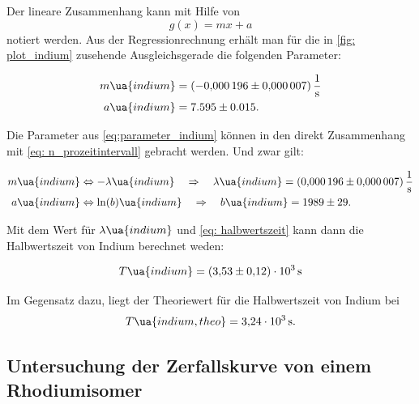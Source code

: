Der lineare Zusammenhang kann mit Hilfe von
\begin{equation*}
  g(x)=mx+a
\end{equation*}
notiert werden.
Aus der Regressionrechnung erhält man für die in \ref{fig: plot_indium} zusehende
Ausgleichsgerade die folgenden Parameter:

\begin{align}
  \label{eq:parameter_indium}
  \begin{aligned}
    m\ua{indium}&=\SI{-0.000196\pm0.000007}{\per\second}\\
    a\ua{indium}&=7.595\pm0.015.
  \end{aligned}
\end{align}

Die Parameter aus \eqref{eq:parameter_indium} können in den direkt Zusammenhang mit
\eqref{eq: n_prozeitintervall} gebracht werden. Und zwar gilt:

\begin{align}
  \label{eq:parameter_indium}
  \begin{aligned}
    m\ua{indium}&\Leftrightarrow -\lambda\ua{indium} \quad \Rightarrow \quad \lambda\ua{indium}=\SI{0.000196\pm0.000007}{\per\second}\\
    a\ua{indium}&\Leftrightarrow \ln(b)\ua{indium} \quad \Rightarrow \quad b\ua{indium} =1989\pm 29.
  \end{aligned}
\end{align}

Mit dem Wert für $\lambda\ua{indium}$ und \eqref{eq: halbwertszeit} kann dann die Halbwertszeit von Indium
berechnet weden:

\begin{equation}
  \label{eq:halbwertzeit_indium}
  T\ua{indium}=\SI{3.53\pm0.12 e+3}{\second}
\end{equation}

Im Gegensatz dazu, liegt der Theoriewert für die Halbwertszeit von Indium\cite{indium_halb} bei
\begin{equation}
  \label{eq:halbwertzeit_indium_theo}
  T\ua{indium,theo}=\SI{3.24 e+3}{\second}.
\end{equation}

\subsection{Untersuchung der Zerfallskurve von einem Rhodiumisomer}
